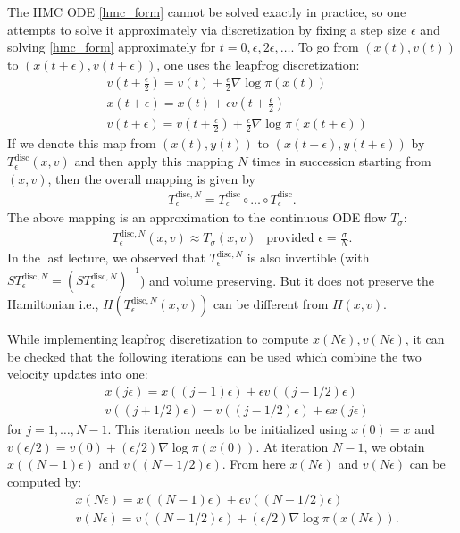 \documentclass{scrartcl}
\begin{document}
The HMC ODE \eqref{hmc_form} cannot be solved exactly in practice, so
one attempts to solve it approximately via discretization by fixing a
step size $\epsilon$ and solving \eqref{hmc_form} approximately for $t
= 0, \epsilon, 2 \epsilon, \dots$. To go from $(x(t), v(t))$ to
$(x(t+\epsilon), v(t + \epsilon))$, one uses the leapfrog
discretization:
\begin{equation}
  \label{leapfrog}
  \begin{split}
&    v\left(t + \frac{\epsilon}{2}\right) = v(t) + \frac{\epsilon}{2}
  \nabla \log \pi(x(t)) \\
& x(t + \epsilon) = x(t) + \epsilon v\left(t + \frac{\epsilon}{2}
  \right) \\
& v(t + \epsilon) = v \left(t + \frac{\epsilon}{2} \right) +
  \frac{\epsilon}{2} \nabla \log \pi(x(t + \epsilon))
  \end{split}
\end{equation}
If we denote this map from $(x(t), y(t))$ to $(x(t + \epsilon), y(t +
\epsilon))$ by $T^{\text{disc}}_{\epsilon}(x, v)$ and then apply this
mapping $N$ times in succession starting from $(x, v)$, then the
overall mapping is given by
\begin{align*}
  T^{\text{disc}, N}_{\epsilon} = T_{\epsilon}^{\text{disc}} \circ \dots \circ
  T_{\epsilon}^{\text{disc}}. 
\end{align*}
The above mapping is an approximation to the continuous ODE flow
$T_{\sigma}$:
\begin{align*}
  T_{\epsilon}^{\text{disc}, N}(x, v) \approx T_{\sigma}(x, v) ~~
  \text{ provided $\epsilon = \frac{\sigma}{N}$}. 
\end{align*}
In the last lecture, we observed that $T_{\epsilon}^{\text{disc}, N}$
is also invertible (with $S T_{\epsilon}^{\text{disc}, N} =
(S T_{\epsilon}^{\text{disc}, N})^{-1}$) and volume preserving. But it
does not preserve the Hamiltonian i.e., $H(T_{\epsilon}^{\text{disc},
  N}(x, v))$ can be different from $H(x, v)$.

While implementing leapfrog discretization to compute $x(N\epsilon),
v(N \epsilon)$, it can be checked that the following iterations can be
used which combine the two velocity updates into one:
\begin{align*}
 & x(j \epsilon) = x((j-1)\epsilon) + \epsilon v \left((j - 1/2)
   \epsilon \right) \\
 & v((j+ 1/2) \epsilon) = v((j-1/2) \epsilon) + \epsilon x(j \epsilon)
\end{align*}
for $j = 1, \dots, N-1$. This iteration needs to be initialized using
$x(0) = x$ and $v(\epsilon/2) = v(0) + (\epsilon/2) \nabla \log
\pi(x(0))$. At iteration $N-1$, we obtain $x((N-1)\epsilon)$ and
$v((N-1/2) \epsilon)$. From here $x(N \epsilon)$ and $v(N \epsilon)$
can be computed by:
\begin{align*}
  &  x(N \epsilon) = x((N-1) \epsilon) + \epsilon v((N-1/2) \epsilon) \\
  & v(N \epsilon) = v((N-1/2)\epsilon) + (\epsilon/2) \nabla \log
    \pi(x(N \epsilon)). 
\end{align*}
\end{document}
